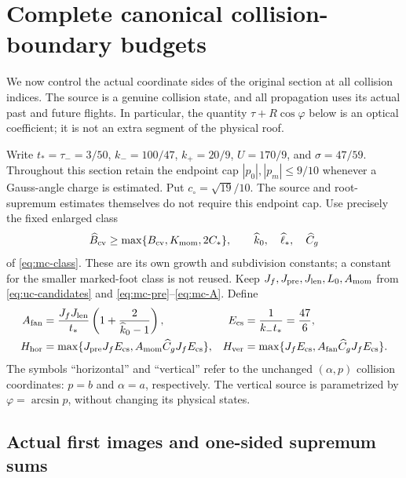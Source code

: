 \section{Complete canonical collision-boundary budgets}
\label{sec:cs-canonical}

We now control the actual coordinate sides of the original section at
all collision indices.  The source is a genuine collision state, and
all propagation uses its actual past and future flights.  In particular,
the quantity $\tau+R\cos\varphi$ below is an optical coefficient;
it is not an extra segment of the physical roof.

Write $t_*=\tau_-=3/50$, $k_-=100/47$, $k_+=20/9$,
$U=170/9$, and $\sigma=47/59$.  Throughout this section retain the
endpoint cap $|p_0|,|p_m|\le9/10$ whenever a Gauss-angle charge is
estimated.  Put $c_\circ=\sqrt{19}/10$.  The source and root-supremum
estimates themselves do not require this endpoint cap.  Use precisely
the fixed enlarged class
\[
 \widehat B_{\rm cv}\ge\max\{B_{\rm cv},K_{\rm mom},2C_*\},
 \qquad \widehat k_0,\quad \widehat\ell_*,\quad\widehat C_g
\]
of \eqref{eq:mc-class}.  These are its own growth and subdivision
constants; a constant for the smaller marked-foot class is not reused.
Keep $J_f,J_{\rm pre},J_{\rm len},L_0,A_{\rm mom}$ from
\eqref{eq:uc-candidates} and \eqref{eq:mc-pre}--\eqref{eq:mc-A}.
Define
\begin{align}
 A_{\rm fan}
   &=\frac{J_fJ_{\rm len}}{t_*}
                    \left(1+\frac2{\widehat k_0-1}\right),&
 E_{\rm cs}&=\frac1{k_-t_*}=\frac{47}{6},
                                                        \label{eq:cs-source-constants}\\
 H_{\rm hor}
   &=\max\{J_{\rm pre}J_f E_{\rm cs},
              A_{\rm mom}\widehat C_gJ_f E_{\rm cs}\},&
 H_{\rm ver}
   &=\max\{J_fE_{\rm cs},
              A_{\rm fan}\widehat C_gJ_f E_{\rm cs}\}.\notag
\end{align}
The symbols ``horizontal'' and ``vertical'' refer to the unchanged
$(\alpha,p)$ collision coordinates: $p=b$ and $\alpha=a$,
respectively.  The vertical source is parametrized by
$\varphi=\arcsin p$, without changing its physical states.

\subsection{Actual first images and one-sided supremum sums}

